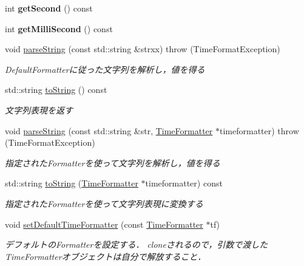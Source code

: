\begin{DoxyCompactItemize}
int {\bfseries get\+Second} () const
\item 
\hypertarget{classskl_1_1_time_a604e6a1d2ffb3fc3a81a269f891588fd}{}\label{classskl_1_1_time_a604e6a1d2ffb3fc3a81a269f891588fd} 
int {\bfseries get\+Milli\+Second} () const
\item 
void \hyperlink{classskl_1_1_time_aa4f63cd3ca5d31ef346b034af94da928}{parse\+String} (const std\+::string \&strxx)  throw (\+Time\+Format\+Exception)
\begin{DoxyCompactList}\small\item\em Default\+Formatterに従った文字列を解析し，値を得る \end{DoxyCompactList}\item 
std\+::string \hyperlink{classskl_1_1_time_affe013a77399e031ab79ab58ae9a306b}{to\+String} () const
\begin{DoxyCompactList}\small\item\em 文字列表現を返す \end{DoxyCompactList}\item 
void \hyperlink{classskl_1_1_time_acc9ee556bd8ddd2b85430b114892365f}{parse\+String} (const std\+::string \&str, \hyperlink{classskl_1_1_time_formatter}{Time\+Formatter} $\ast$timeformatter)  throw (\+Time\+Format\+Exception)
\begin{DoxyCompactList}\small\item\em 指定された\+Formatterを使って文字列を解析し，値を得る \end{DoxyCompactList}\item 
std\+::string \hyperlink{classskl_1_1_time_a44aed89659091d18d67e4503c47f0748}{to\+String} (\hyperlink{classskl_1_1_time_formatter}{Time\+Formatter} $\ast$timeformatter) const
\begin{DoxyCompactList}\small\item\em 指定された\+Formatterを使って文字列表現に変換する \end{DoxyCompactList}\item 
void \hyperlink{classskl_1_1_time_a523581fa6908222b9cec994dd325458c}{set\+Default\+Time\+Formatter} (const \hyperlink{classskl_1_1_time_formatter}{Time\+Formatter} $\ast$tf)
\begin{DoxyCompactList}\small\item\em デフォルトの\+Formatterを設定する． cloneされるので，引数で渡した\+Time\+Formatterオブジェクトは自分で解放すること． \end{DoxyCompactList}\item 
\hypertarget{classskl_1_1_time_a4ffada22c1d4786f68ba2c03689d948e}{}\label{classskl_1_1_time_a4ffada22c1d4786f68ba2c03689d948e} 

\end{DoxyCompactItemize}
